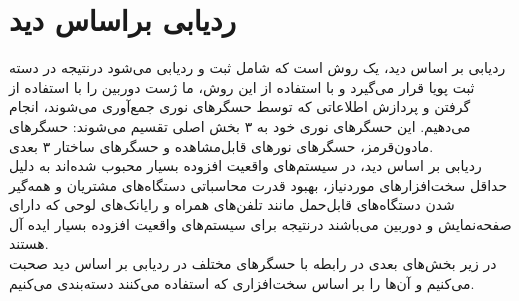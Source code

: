 \section{ردیابی براساس دید\protect{}}
ردیابی بر اساس دید، یک روش است که شامل ثبت و ردیابی می‌شود درنتیجه در دسته ثبت پویا قرار می‌گیرد و با استفاده از این روش، ما ژست دوربین را با استفاده از گرفتن و پردازش اطلاعاتی که توسط حسگرهای نوری جمع‌آوری می‌شوند، انجام می‌دهیم. این حسگرهای نوری خود به ۳ بخش اصلی تقسیم می‌شوند: حسگرهای مادون‌قرمز، حسگرهای نورهای قابل‌مشاهده و حسگرهای ساختار ۳ بعدی.
\\
ردیابی بر اساس دید، در سیستم‌های واقعیت افزوده بسیار محبوب شده‌اند به دلیل حداقل سخت‌افزارهای موردنیاز، بهبود قدرت محاسباتی دستگاه‌های مشتریان  و همه‌گیر شدن دستگاه‌های قابل‌حمل مانند تلفن‌های همراه و رایانک‌های لوحی که دارای صفحه‌نمایش و دوربین می‌باشند درنتیجه برای سیستم‌های واقعیت افزوده بسیار ایده آل هستند.
\\
در زیر بخش‌های بعدی در رابطه با حسگرهای مختلف در ردیابی بر اساس دید صحبت می‌کنیم و آن‌ها را بر اساس سخت‌افزاری که استفاده می‌کنند دسته‌بندی می‌کنیم.


